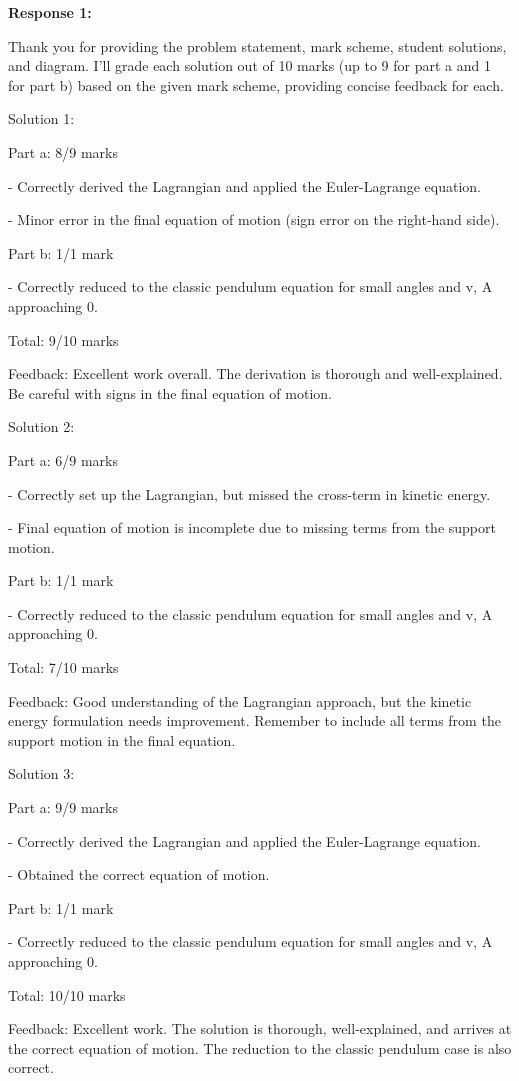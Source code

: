\documentclass[a4paper,11pt]{article}
\begin{document}
\textbf{Response 1:}

Thank you for providing the problem statement, mark scheme, student solutions, and diagram. I'll grade each solution out of 10 marks (up to 9 for part a and 1 for part b) based on the given mark scheme, providing concise feedback for each.

Solution 1:

Part a: 8/9 marks

- Correctly derived the Lagrangian and applied the Euler-Lagrange equation.

- Minor error in the final equation of motion (sign error on the right-hand side).

Part b: 1/1 mark

- Correctly reduced to the classic pendulum equation for small angles and v, A approaching 0.

Total: 9/10 marks

Feedback: Excellent work overall. The derivation is thorough and well-explained. Be careful with signs in the final equation of motion.

Solution 2:

Part a: 6/9 marks

- Correctly set up the Lagrangian, but missed the cross-term in kinetic energy.

- Final equation of motion is incomplete due to missing terms from the support motion.

Part b: 1/1 mark

- Correctly reduced to the classic pendulum equation for small angles and v, A approaching 0.

Total: 7/10 marks

Feedback: Good understanding of the Lagrangian approach, but the kinetic energy formulation needs improvement. Remember to include all terms from the support motion in the final equation.

Solution 3:

Part a: 9/9 marks

- Correctly derived the Lagrangian and applied the Euler-Lagrange equation.

- Obtained the correct equation of motion.

Part b: 1/1 mark

- Correctly reduced to the classic pendulum equation for small angles and v, A approaching 0.

Total: 10/10 marks

Feedback: Excellent work. The solution is thorough, well-explained, and arrives at the correct equation of motion. The reduction to the classic pendulum case is also correct.
\end{document}
